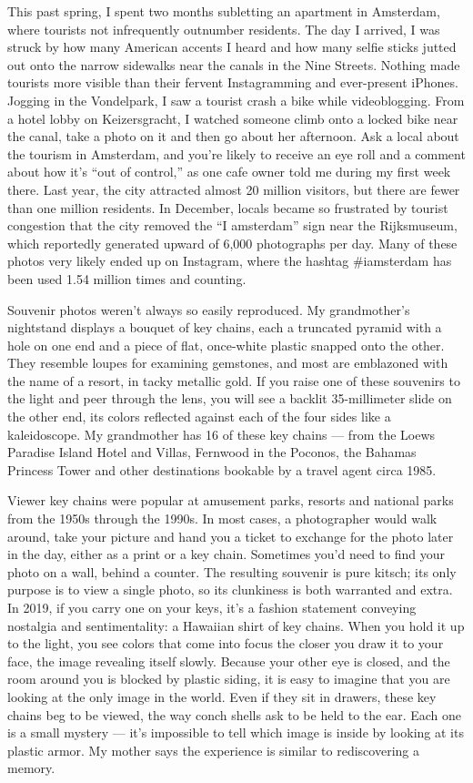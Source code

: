 This past spring, I spent two months subletting an apartment in
Amsterdam, where tourists not infrequently outnumber residents. The day
I arrived, I was struck by how many American accents I heard and how
many selfie sticks jutted out onto the narrow sidewalks near the canals
in the Nine Streets. Nothing made tourists more visible than their
fervent Instagramming and ever-present iPhones. Jogging in the
Vondelpark, I saw a tourist crash a bike while videoblogging. From a
hotel lobby on Keizersgracht, I watched someone climb onto a locked bike
near the canal, take a photo on it and then go about her afternoon. Ask
a local about the tourism in Amsterdam, and you're likely to receive an
eye roll and a comment about how it's ``out of control,'' as one cafe
owner told me during my first week there. Last year, the city attracted
almost 20 million visitors, but there are fewer than one million
residents. In December, locals became so frustrated by tourist
congestion that the city removed the ``I amsterdam'' sign near the
Rijksmuseum, which reportedly generated upward of 6,000 photographs per
day. Many of these photos very likely ended up on Instagram, where the
hashtag \#iamsterdam has been used 1.54 million times and counting.

Souvenir photos weren't always so easily reproduced. My grandmother's
nightstand displays a bouquet of key chains, each a truncated pyramid
with a hole on one end and a piece of flat, once-white plastic snapped
onto the other. They resemble loupes for examining gemstones, and most
are emblazoned with the name of a resort, in tacky metallic gold. If you
raise one of these souvenirs to the light and peer through the lens, you
will see a backlit 35-millimeter slide on the other end, its colors
reflected against each of the four sides like a kaleidoscope. My
grandmother has 16 of these key chains --- from the Loews Paradise
Island Hotel and Villas, Fernwood in the Poconos, the Bahamas Princess
Tower and other destinations bookable by a travel agent circa 1985.

Viewer key chains were popular at amusement parks, resorts and national
parks from the 1950s through the 1990s. In most cases, a photographer
would walk around, take your picture and hand you a ticket to exchange
for the photo later in the day, either as a print or a key chain.
Sometimes you'd need to find your photo on a wall, behind a counter. The
resulting souvenir is pure kitsch; its only purpose is to view a single
photo, so its clunkiness is both warranted and extra. In 2019, if you
carry one on your keys, it's a fashion statement conveying nostalgia and
sentimentality: a Hawaiian shirt of key chains. When you hold it up to
the light, you see colors that come into focus the closer you draw it to
your face, the image revealing itself slowly. Because your other eye is
closed, and the room around you is blocked by plastic siding, it is easy
to imagine that you are looking at the only image in the world. Even if
they sit in drawers, these key chains beg to be viewed, the way conch
shells ask to be held to the ear. Each one is a small mystery --- it's
impossible to tell which image is inside by looking at its plastic
armor. My mother says the experience is similar to rediscovering a
memory.

